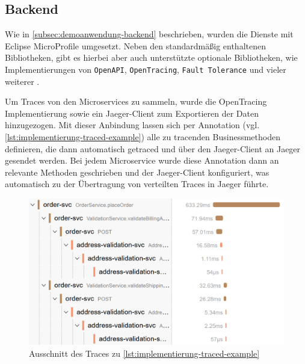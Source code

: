 \subsection{Backend}

Wie in \autoref{subsec:demoanwendung-backend} beschrieben, wurden die Dienste mit Eclipse MicroProfile umgesetzt. Neben den standardmäßig enthaltenen Bibliotheken, gibt es hierbei aber auch unterstützte optionale Bibliotheken, wie Implementierungen von \texttt{OpenAPI}, \texttt{OpenTracing}, \texttt{Fault Tolerance} und vieler weiterer \cite{EclipseMicroprofile}.

Um Traces von den Microservices zu sammeln, wurde die OpenTracing Implementierung sowie ein Jaeger-Client \cite{JaegerClient} zum Exportieren der Daten hinzugezogen. Mit dieser Anbindung lassen sich per Annotation (vgl. \autoref{lst:implementierung-traced-example}) alle zu tracenden Businessmethoden definieren, die dann automatisch getraced und über den Jaeger-Client an Jaeger gesendet werden. Bei jedem Microservice wurde diese Annotation dann an relevante Methoden geschrieben und der Jaeger-Client konfiguriert, was automatisch zu der Übertragung von verteilten Traces in Jaeger führte.



\begin{figure}
\centering
\vspace{-\baselineskip}
\includegraphics[width=\linewidth]{img/04_erstellung-poc/implementierung_jaeger-trace-example.png}
\caption{Ausschnitt des Traces zu \autoref{lst:implementierung-traced-example}}
\label{fig:implementierung_jaeger-trace-example}
\end{figure}

